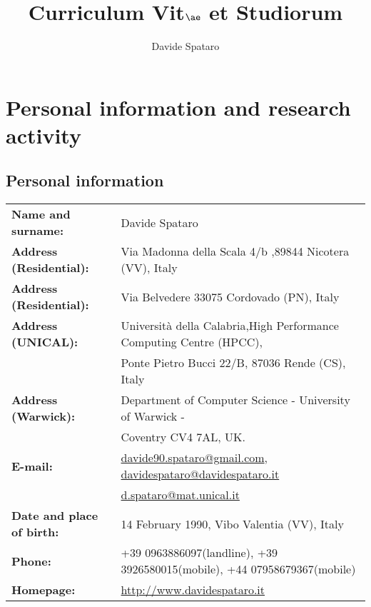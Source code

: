 \documentclass[a4paper,10pt]{article}
\title{Curriculum Vit$\ae$ et Studiorum}
\author{Davide Spataro}
\begin{document}
\maketitle

\tableofcontents

\newpage

\section{Personal information and research activity}

\subsection{Personal information}

\begin{table}[h]
\begin{tabular}{l l}
\textbf{Name and surname:} & Davide Spataro \\
\textbf{Address (Residential):} & Via Madonna della Scala 4/b ,89844 Nicotera
(VV), Italy \\
\textbf{Address (Residential):} & Via Belvedere 33075 Cordovado (PN), Italy
\\
\textbf{Address (UNICAL):} & Universit\`a della Calabria,High Performance
Computing Centre (HPCC),\\&  Ponte Pietro Bucci 22/B, 87036 Rende (CS),
Italy
\\
\textbf{Address (Warwick):} & Department of Computer Science -  University
of Warwick -\\
& Coventry CV4 7AL, UK.
\\
\textbf{E-mail:} &
\href{mailto:davide90.spataro@gmail.com}{davide90.spataro@gmail.com},
\href{mailto:davidespataro@davidespataro.it}{davidespataro@davidespataro.it}\\&
\href{mailto:d.spataro@mat.unical.it}{d.spataro@mat.unical.it}
\\
\textbf{Date and place of birth:} & 14 February 1990, Vibo Valentia (VV),
Italy \\
\textbf{Phone: }& +39 0963886097(landline), +39 3926580015(mobile),
+44 07958679367(mobile) \\
\textbf{Homepage: }& \url{http://www.davidespataro.it} \\
\end{tabular}
\end{table}

\begin{center}
\mbox{}
\end{center}
 
\end{document}
